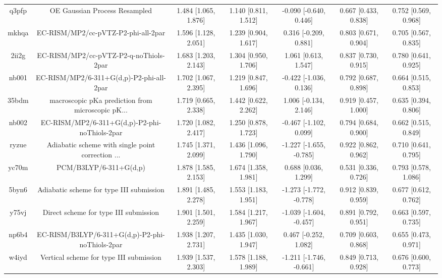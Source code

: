 \documentclass{article}
\begin{document}
\begin{center}
\begin{longtable}{|ccccccc|}
 q3pfp &                      OE Gaussian Process Resampled &  1.484 [1.065, 1.876] &  1.140 [0.811, 1.512] &   -0.090 [-0.640, 0.446] &  0.667 [0.433, 0.838] &   0.752 [0.569, 0.968] \\
 mkhqa &                EC-RISM/MP2/cc-pVTZ-P2-phi-all-2par &  1.596 [1.128, 2.051] &  1.239 [0.904, 1.617] &    0.316 [-0.209, 0.881] &  0.803 [0.671, 0.904] &   0.705 [0.567, 0.835] \\
 2ii2g &             EC-RISM/MP2/cc-pVTZ-P2-q-noThiols-2par &  1.683 [1.203, 2.143] &  1.304 [0.950, 1.706] &     1.061 [0.613, 1.547] &  0.837 [0.730, 0.915] &   0.780 [0.641, 0.925] \\
 nb001 &           EC-RISM/MP2/6-311+G(d,p)-P2-phi-all-2par &  1.702 [1.067, 2.395] &  1.219 [0.847, 1.696] &   -0.422 [-1.036, 0.136] &  0.792 [0.687, 0.898] &   0.664 [0.515, 0.853] \\
 35bdm &  macroscopic pKa prediction from microscopic pK... &  1.719 [0.665, 2.338] &  1.442 [0.622, 2.262] &    1.006 [-0.134, 2.146] &  0.919 [0.457, 1.000] &   0.635 [0.394, 0.806] \\
 nb002 &      EC-RISM/MP2/6-311+G(d,p)-P2-phi-noThiols-2par &  1.720 [1.082, 2.417] &  1.250 [0.878, 1.723] &   -0.467 [-1.102, 0.099] &  0.794 [0.684, 0.900] &   0.662 [0.515, 0.849] \\
 ryzue &  Adiabatic scheme with single point correction ... &  1.745 [1.371, 2.099] &  1.436 [1.096, 1.790] &  -1.227 [-1.655, -0.785] &  0.922 [0.862, 0.962] &   0.710 [0.641, 0.795] \\
 yc70m &                             PCM/B3LYP/6-311+G(d,p) &  1.878 [1.585, 2.153] &  1.674 [1.358, 1.981] &     0.688 [0.036, 1.299] &  0.531 [0.336, 0.726] &   0.793 [0.578, 1.086] \\
 5byn6 &           Adiabatic scheme for type III submission &  1.891 [1.485, 2.278] &  1.553 [1.183, 1.951] &  -1.273 [-1.772, -0.778] &  0.912 [0.839, 0.959] &   0.677 [0.612, 0.762] \\
 y75vj &              Direct scheme for type III submission &  1.901 [1.501, 2.259] &  1.584 [1.217, 1.967] &  -1.039 [-1.604, -0.457] &  0.891 [0.792, 0.951] &   0.663 [0.597, 0.735] \\
 np6b4 &    EC-RISM/B3LYP/6-311+G(d,p)-P2-phi-noThiols-2par &  1.938 [1.207, 2.731] &  1.435 [1.030, 1.947] &    0.467 [-0.252, 1.082] &  0.709 [0.603, 0.868] &   0.655 [0.473, 0.971] \\
 w4iyd &            Vertical scheme for type III submission &  1.939 [1.537, 2.303] &  1.578 [1.188, 1.989] &  -1.211 [-1.746, -0.661] &  0.849 [0.713, 0.928] &   0.676 [0.600, 0.773] \\

\end{longtable}
\end{center}
\end{document}
